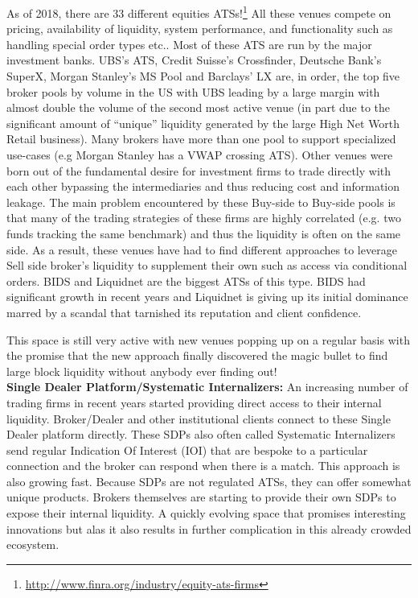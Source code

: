As of 2018, there are 33 different equities ATSs!\footnote{\url{http://www.finra.org/industry/equity-ats-firms}} All these venues compete on pricing, availability of liquidity, system performance, and functionality such as handling special order types etc.. Most of these ATS are run by the major investment banks. UBS's ATS, Credit Suisse's Crossfinder, Deutsche Bank's SuperX, Morgan Stanley's MS Pool and Barclays' LX are, in order,  the top five broker pools by volume in the US with UBS leading by a large margin with almost double the volume of the second most active venue (in part due to the significant amount of ``unique'' liquidity generated by the large High Net Worth Retail business).  Many brokers have more than one pool to support specialized use-cases (e.g Morgan Stanley has a VWAP crossing ATS). Other venues were born out of the fundamental desire for investment firms to trade directly with each other bypassing the intermediaries and  thus reducing cost and information leakage.  The main problem encountered by these Buy-side to Buy-side pools is that many of the trading strategies of these firms are highly correlated (e.g. two funds tracking the same benchmark) and thus the liquidity is often on the same side. As a result, these venues have had to find different approaches to leverage Sell side broker's liquidity to supplement their own such as access via conditional orders. BIDS and Liquidnet are the biggest ATSs of this type. BIDS had significant growth in recent years and Liquidnet is giving up its initial dominance marred by a scandal that tarnished its reputation and client confidence.


This space is still very active with new venues popping up on a regular basis with the promise that the new approach finally discovered the magic bullet to find large block liquidity without anybody ever finding out! \\


\noindent\textbf{Single Dealer Platform/Systematic Internalizers:} An increasing number of trading firms in recent years started providing direct access to their internal liquidity. Broker/Dealer and other institutional clients connect to these Single Dealer platform directly. These SDPs also often called Systematic Internalizers send regular Indication Of Interest (IOI)  that are bespoke to a particular connection and the broker can respond when there is a match. This approach is also growing fast. Because SDPs are not regulated ATSs, they can offer somewhat unique products. Brokers themselves are starting to provide their own SDPs to expose their internal liquidity. A quickly evolving space that promises interesting innovations but alas it also results in further complication in this already crowded ecosystem. \\


